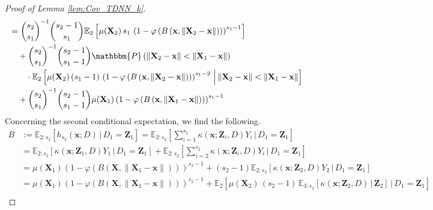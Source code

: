 \documentclass[letterpaper,10pt]{article}
\numberwithin{equation}{section}
\numberwithin{thm}{section}
\numberwithin{lem}{section}
\numberwithin{cor}{section}
\newcommand{\E}{\mathbb{E}}
\newcommand{\1}{\mathbbm{1}}
\renewcommand{\P}{\mathbbm{P}}
\begin{document}
\begin{proof}[Proof of Lemma \ref{lem:Cov_TDNN_k}]
\begin{equation}
\begin{aligned}
			 & = \binom{s_2}{s_1}^{-1}\binom{s_2 - 1}{s_1}
			\E_{2}\left[\mu(\mathbf{X}_2) \, s_1 \, \left(1 - \varphi\left(B\left(\mathbf{x}, \| \mathbf{X}_2 - \mathbf{x} \|\right)\right)\right)^{s_1 - 1}\right]                     \\
			 & \quad + \binom{s_2}{s_1}^{-1}\binom{s_2 - 1}{s_1 - 1}
			\P\left(\|\mathbf{X}_2 - \mathbf{x}\| < \|\mathbf{X}_1 - \mathbf{x}\|\right)                                                                                                \\
			 & \quad \quad \cdot
			\E_{2}\left[\mu(\mathbf{X}_2) \, (s_1 - 1) \,
				\left(1 - \varphi\left(B\left(\mathbf{x}, \| \mathbf{X}_2 - \mathbf{x} \|\right)\right)\right)^{s_1 - 2}
			\, \Big| \, \|\mathbf{X}_2 - \mathbf{x}\| < \|\mathbf{X}_1 - \mathbf{x}\|\right]                                                                                            \\
			 & \quad + \binom{s_2}{s_1}^{-1}\binom{s_2 - 1}{s_1 - 1}\mu(\mathbf{X}_1)
			\left(1 - \varphi\left(B\left(\mathbf{x}, \| \mathbf{X}_1 - \mathbf{x} \|\right)\right)\right)^{s_1 - 1}
		\end{aligned}
	\end{equation}
	Concerning the second conditional expectation, we find the following.
	\begin{equation}
		\begin{aligned}
			B
			 & := \E_{2:s_2}\left[h_{s_2}\left(\mathbf{x}; D\right)\, \Big| \, D_1 = \mathbf{Z}_1\right]
			= \E_{2:s_2}\left[\sum_{i = 1}^{s_2} \kappa(\mathbf{x}; \mathbf{Z}_i, D) Y_i \, \Big| \, D_1 = \mathbf{Z}_1\right]              \\
			 & = \E_{2:s_2}\left[\kappa(\mathbf{x}; \mathbf{Z}_1, D) Y_1 \, \Big| \, D_1 = \mathbf{Z}_1\right]
			+ \E_{2:s_2}\left[\sum_{i = 2}^{s_2} \kappa(\mathbf{x}; \mathbf{Z}_i, D) Y_i \, \Big| \, D_1 = \mathbf{Z}_1\right]              \\
			 & = \mu(\mathbf{X}_1) \left(1 - \varphi\left(B\left(\mathbf{X}, \| \mathbf{X}_1 - \mathbf{x} \|\right)\right)\right)^{s_2 - 1}
			+ (s_2 - 1)\E_{2:s_2}\left[\kappa(\mathbf{x}; \mathbf{Z}_2, D) Y_2 \, \Big| \, D_1 = \mathbf{Z}_1\right]                        \\
			 & = \mu(\mathbf{X}_1) \left(1 - \varphi\left(B\left(\mathbf{X}, \| \mathbf{X}_1 - \mathbf{x} \|\right)\right)\right)^{s_2 - 1}
			+ \E_{2}\left[
				\mu(\mathbf{X}_2) \, (s_2 - 1) \, \E_{3:s_2}\left[\kappa(\mathbf{x}; \mathbf{Z}_2, D)\, | \, \mathbf{Z}_2\right]
			\, \Big| \, D_1 = \mathbf{Z}_1\right]                                                                                           \\

\end{aligned}
\end{equation}
\end{proof}
\end{document}

